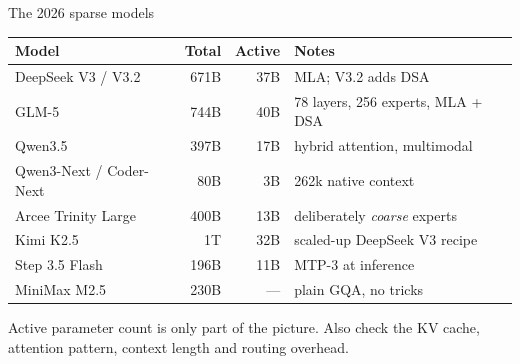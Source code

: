 \documentclass[aspectratio=169,10pt]{beamer}
\begin{document}
\begin{frame}[shrink=6]{The 2026 sparse models}
  \centering
  \begin{tabular}{@{}l r r l@{}}
    \toprule
    \textbf{Model} & \textbf{Total} & \textbf{Active} & \textbf{Notes}\\
    \midrule
    DeepSeek V3 / V3.2 & 671B & 37B & MLA; V3.2 adds DSA\\
    GLM-5 & 744B & 40B & 78 layers, 256 experts, MLA + DSA\\
    Qwen3.5 & 397B & 17B & hybrid attention, multimodal\\
    Qwen3-Next / Coder-Next & 80B & 3B & 262k native context\\
    Arcee Trinity Large & 400B & 13B & deliberately \emph{coarse} experts\\
    Kimi K2.5 & 1T & 32B & scaled-up DeepSeek V3 recipe\\
    Step 3.5 Flash & 196B & 11B & MTP-3 at inference\\
    MiniMax M2.5 & 230B & --- & plain GQA, no tricks\\
    \bottomrule
  \end{tabular}
  \vspace{0.8em}
  \begin{gotcha}
    Active parameter count is only part of the picture. Also check the KV
    cache, attention pattern, context length and routing overhead.
  \end{gotcha}
\end{frame}
\end{document}
